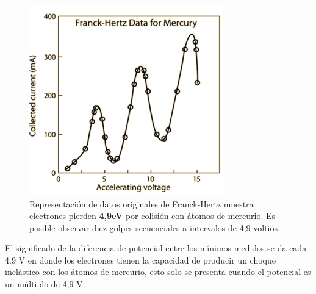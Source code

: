 \documentclass{article}									%
\begin{document}
\begin{figure}[H]
  \centering
     \includegraphics[width=0.75\textwidth]{grafica2}
  \caption{Representación de datos originales de Franck-Hertz muestra electrones pierden \textbf{4,9eV} por colisión con átomos de mercurio. Es posible observar diez golpes secuenciales a intervalos de 4,9 voltios.}
      \label{fig:grafica2}
\end{figure}
El significado de la diferencia de potencial entre los mínimos medidos se da cada 4.9 V en donde los electrones tienen la capacidad de producir un choque inelástico con los átomos de mercurio, esto solo se presenta cuando el potencial es un múltiplo de 4,9 V.
\end{document}
